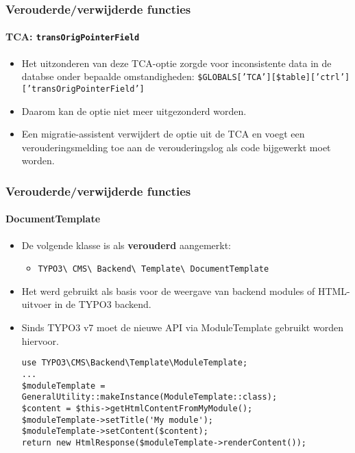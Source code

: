 \begin{frame}[fragile]
	\frametitle{Verouderde/verwijderde functies}
	\framesubtitle{TCA: \texttt{transOrigPointerField}}

	\begin{itemize}
		\item Het uitzonderen van deze TCA-optie zorgde voor inconsistente data in de databse onder bepaalde omstandigheden:
			\small
				\texttt{\$GLOBALS['TCA'][\$table]['ctrl']['transOrigPointerField']}
			\normalsize

		\item Daarom kan de optie niet meer uitgezonderd worden.
		\item Een migratie-assistent verwijdert de optie uit de TCA en voegt een verouderingsmelding
			toe aan de verouderingslog als code bijgewerkt moet worden.
	\end{itemize}

\end{frame}


\begin{frame}[fragile]
	\frametitle{Verouderde/verwijderde functies}
	\framesubtitle{DocumentTemplate}

	\lstset{basicstyle=\tiny\ttfamily}

	\begin{itemize}
		\item De volgende klasse is als \textbf{verouderd} aangemerkt:

			\begin{itemize}
				\item \texttt{TYPO3\textbackslash
					CMS\textbackslash
					Backend\textbackslash
					Template\textbackslash
					DocumentTemplate}
			\end{itemize}

		\item Het werd gebruikt als basis voor de weergave van backend modules of HTML-uitvoer in de TYPO3 backend.
		\item Sinds TYPO3 v7 moet de nieuwe API via ModuleTemplate gebruikt worden hiervoor.

\vspace{-0.4cm}
\begin{lstlisting}
use TYPO3\CMS\Backend\Template\ModuleTemplate;
...
$moduleTemplate = GeneralUtility::makeInstance(ModuleTemplate::class);
$content = $this->getHtmlContentFromMyModule();
$moduleTemplate->setTitle('My module');
$moduleTemplate->setContent($content);
return new HtmlResponse($moduleTemplate->renderContent());
\end{lstlisting}

	\end{itemize}

\end{frame}

